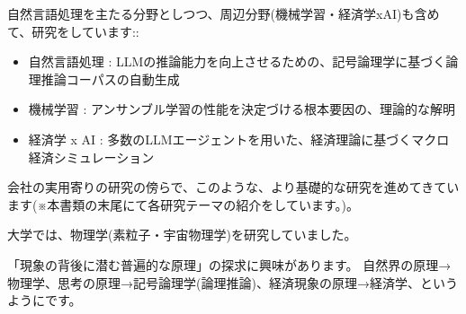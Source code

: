 \indent 自然言語処理を主たる分野としつつ、周辺分野(機械学習・経済学xAI)も含めて、研究をしています::
\vspace{1mm}
\begin{itemize}
  \item 自然言語処理 : LLMの推論能力を向上させるための、記号論理学に基づく論理推論コーパスの自動生成
  \item 機械学習     : アンサンブル学習の性能を決定づける根本要因の、理論的な解明
  \item 経済学 x AI  : 多数のLLMエージェントを用いた、経済理論に基づくマクロ経済シミュレーション
\end{itemize}
\vspace{0.5mm}
\indent 会社の実用寄りの研究の傍らで、このような、より基礎的な研究を進めてきています(※本書類の末尾にて各研究テーマの紹介をしています。)。


\vspace{3mm}
\indent 大学では、物理学(素粒子・宇宙物理学)を研究していました。


\vspace{3mm}
\indent 「現象の背後に潜む普遍的な原理」の探求に興味があります。
自然界の原理→物理学、思考の原理→記号論理学(論理推論)、経済現象の原理→経済学、というようにです。
